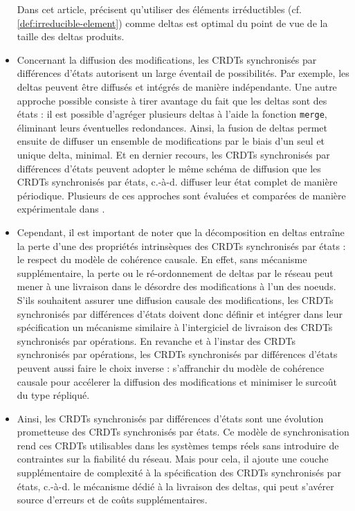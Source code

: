 \documentclass[12pt]{thesul}
\newcommand{\ie}{c.-à-d. }
\begin{document}
\begin{itemize}
    Dans cet article, \citeauthor{enes2019} précisent qu'utiliser des éléments irréductibles (cf. \autoref{def:irreducible-element}) comme deltas est optimal du point de vue de la taille des deltas produits.
  \item Concernant la diffusion des modifications, les \acp{CRDT} synchronisés par différences d'états autorisent un large éventail de possibilités.
    Par exemple, les deltas peuvent être diffusés et intégrés de manière indépendante.
    Une autre approche possible consiste à tirer avantage du fait que les deltas sont des états : il est possible d'agréger plusieurs deltas à l'aide la fonction \texttt{merge}, éliminant leurs éventuelles redondances.
    Ainsi, la fusion de deltas permet ensuite de diffuser un ensemble de modifications par le biais d'un seul et unique delta, minimal.
    Et en dernier recours, les \acp{CRDT} synchronisés par différences d'états peuvent adopter le même schéma de diffusion que les \acp{CRDT} synchronisés par états, \ie diffuser leur état complet de manière périodique.
    Plusieurs de ces approches sont évaluées et comparées de manière expérimentale dans \cite{enes2019}.
  \item Cependant, il est important de noter que la décomposition en deltas entraîne la perte d'une des propriétés intrinsèques des \acp{CRDT} synchronisés par états : le respect du modèle de cohérence causale.
    En effet, sans mécanisme supplémentaire, la perte ou le ré-ordonnement de deltas par le réseau peut mener à une livraison dans le désordre des modifications à l'un des noeuds.
    S'ils souhaitent assurer une diffusion causale des modifications, les \acp{CRDT} synchronisés par différences d'états doivent donc définir et intégrer dans leur spécification un mécanisme similaire à l'intergiciel de livraison des \acp{CRDT} synchronisés par opérations.
    En revanche et à l'instar des \acp{CRDT} synchronisés par opérations, les \acp{CRDT} synchronisés par différences d'états peuvent aussi faire le choix inverse : s'affranchir du modèle de cohérence causale pour accélerer la diffusion des modifications et minimiser le surcoût du type répliqué.
  \item Ainsi, les \acp{CRDT} synchronisés par différences d'états sont une évolution prometteuse des \acp{CRDT} synchronisés par états.
    Ce modèle de synchronisation rend ces \acp{CRDT} utilisables dans les systèmes temps réels sans introduire de contraintes sur la fiabilité du réseau.
    Mais pour cela, il ajoute une couche supplémentaire de complexité à la spécification des \acp{CRDT} synchronisés par états, \ie le mécanisme dédié à la livraison des deltas, qui peut s'avérer source d'erreurs et de coûts supplémentaires.
\end{itemize}
\end{document}
